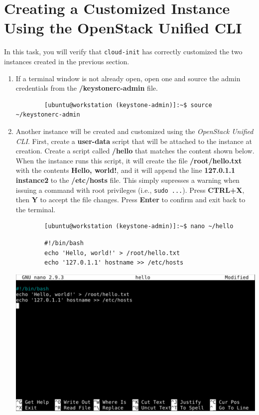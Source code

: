 \documentclass[letterpaper, 12pt]{article}
\begin{document}
\section{Creating a Customized Instance Using the OpenStack Unified CLI}
\label{sec:creating_a_customized_instance_using_the_openstack_unified_cli}
In this task, you will verify that \texttt{cloud-init} has correctly customized the two instances created in the
previous section.

\begin{enumerate}
    \item If a terminal window is not already open, open one and source the admin credentials from the 
    \textbf{\texttildemid/keystonerc-admin} file.
    \begin{lstlisting}
        [ubuntu@workstation (keystone-admin)]:~$ source ~/keystonerc-admin
    \end{lstlisting}

    \item Another instance will be created and customized using the \textit{OpenStack Unified CLI}. First, create a
    \textbf{user-data} script that will be attached to the instance at creation. Create a script called
    \textbf{\texttildemid/hello} that matches the content shown below. When the instance runs this script, it will
    create the file \textbf{/root/hello.txt} with the contents \textbf{Hello, world!}, and it will append the line
    \textbf{127.0.1.1 instance2} to the \textbf{/etc/hosts} file. This simply supresses a warning when issuing a
    command with root privileges (i.e., \texttt{sudo ...}). Press \textbf{CTRL+X}, then \textbf{Y} to accept the file
    changes. Press \textbf{Enter} to confirm and exit back to the terminal.
    \begin{lstlisting}
        [ubuntu@workstation (keystone-admin)]:~$ nano ~/hello
    \end{lstlisting}
    \begin{lstlisting}
        #!/bin/bash
        echo 'Hello, world!' > /root/hello.txt
        echo '127.0.1.1' hostname >> /etc/hosts
    \end{lstlisting}

    \begin{center}
        \includegraphics[width=\linewidth]{images/part3/step2.png}
    \end{center}


\end{enumerate}
\end{document}
